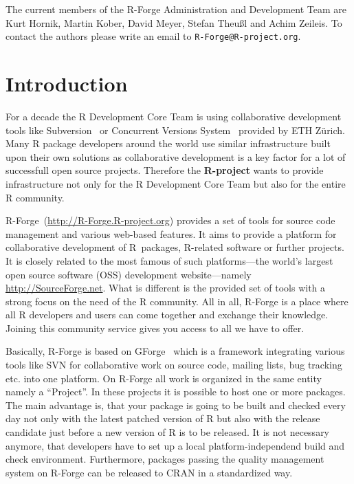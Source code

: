 \documentclass[a4paper]{article}
\newcommand{\RFORGE}{R-Forge Administration and Development Team}
\let\email=\texttt
\newcommand{\proglang}[1]{\textsf{#1}}
\begin{document}
\vspace{0.5cm}
The current members of the \RFORGE{} are Kurt Hornik, Martin Kober,
David Meyer, Stefan Theu\ss{}l and Achim Zeileis. To contact the
authors please write an email to \email{R-Forge@R-project.org}.

\newpage

\pagestyle{plain}
\tableofcontents

\clearpage
\pagestyle{headings}
\setcounter{page}{1}

\section{Introduction}
\label{sec:intro}

For a decade the \proglang{R} Development Core Team is using collaborative
development tools like Subversion~\citep[SVN,
see][]{forge:Pilato+Collins-Sussman+Fitzpatrick:2004} or Concurrent
Versions System~\citep[CVS, see][]{forge:Cederqvist:2006} provided by
ETH Z\"urich.   
Many \proglang{R} package
developers around the world use similar infrastructure built upon their own
solutions as collaborative development is a key factor for a lot of
successfull open source projects. Therefore the \textbf{R-project}
wants to provide infrastructure not only
for the \proglang{R} Development Core Team but also for the entire
\proglang{R} community. 

R-Forge~(\url{http://R-Forge.R-project.org}) provides a set of tools
for source code management and various web-based
features. It aims to provide a platform for collaborative development of
\proglang{R}~packages, \proglang{R}-related software or further projects. It is
closely related to the most famous of such platforms---the 
world's largest open source software (OSS) development website---namely
\url{http://SourceForge.net}. What is different is the provided set of
tools with a strong focus on the need of the \proglang{R}
community. All in all, R-Forge is a place where all \proglang{R}
developers and users can come together and exchange 
their knowledge. Joining this community service gives you access to
all we have to offer. 

Basically, R-Forge is based on 
GForge~\citep{forge:copeland_et_al:2006} which is a framework
integrating various tools like 
SVN for collaborative work on source code, mailing lists, bug tracking
etc. into one platform. On R-Forge all work is organized in
the same entity namely a ``Project''. In these projects it is possible
to host one or more packages. The main advantage is, that your package
is going to be built and checked every day 
not only with the latest patched version of \proglang{R} but also with
the release candidate just before a new version of \proglang{R} is to be
released. It is not necessary anymore, that developers have to set up
a local platform-independend build and check environment. Furthermore,
packages passing the quality management system on R-Forge can be
released to CRAN in a standardized way.
\end{document}
